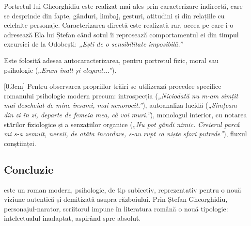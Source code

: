 Portretul lui Gheorghidiu este realizat mai ales prin caracterizare indirectă, care se desprinde din fapte, gânduri, limbaj, gesturi, atitudini și din relațiile cu celelalte personaje. Caracterizarea directă este realizată rar, aceea pe care i-o adresează Ela lui Ștefan când soțul îi reproșează comportamentul ei din timpul excursiei de la Odobești: \textit{„Ești de o sensibilitate imposibilă.”}

Este folosită adesea autocaracterizarea, pentru portretul fizic, moral sau psihologic (\textit{„Eram înalt și elegant...”}).

[0.3cm]
Pentru observarea propriilor trăiri se utilizează procedee specifice romanului psihologic modern precum: introspecția (\textit{„Niciodată nu m-am simțit mai descheiat de mine însumi, mai nenorocit.”}), autoanaliza lucidă (\textit{„Simțeam din zi în zi, departe de  femeia mea, că voi muri.”}), monologul interior, cu notarea stărilor fiziologice și a senzațiilor organice (\textit{„Nu pot gândi nimic. Creierul parcă mi s-a zemuit, nervii, de atâta încordare, s-au rupt ca niște sfori putrede”}), fluxul conștiinței.


\subsection{Concluzie}

\operatitle este un roman modern, psihologic, de tip subiectiv, reprezentativ pentru o nouă viziune autentică și demitizată asupra războiului. Prin Ștefan Gheorghidiu, personajul-narator, scriitorul impune în literatura română o nouă tipologie: intelectualul inadaptat, aspirând spre absolut.
